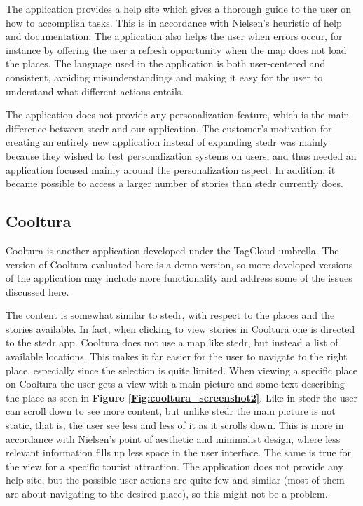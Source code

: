 The application provides a help site which gives a thorough guide to the user on how to accomplish tasks. This is in accordance with Nielsen's heuristic of help and documentation. The application also helps the user when errors occur, for instance by offering the user a refresh opportunity when the map does not load the places. The language used in the application is both user-centered and consistent, avoiding misunderstandings and making it easy for the user to understand what different actions entails. \newline

The application does not provide any personalization feature, which is the main difference between stedr and our application. The customer’s motivation for creating an entirely new application instead of expanding stedr was mainly because they wished to test personalization systems on users, and thus needed an application focused mainly around the personalization aspect. In addition, it became possible to access a larger number of stories than stedr currently does. 

\subsection{Cooltura}

Cooltura is another application developed under the TagCloud umbrella. The version of Cooltura evaluated here is a demo version, so more developed versions of the application may include more functionality and address some of the issues discussed here. \newline

The content is somewhat similar to stedr, with respect to the places and the stories available. In fact, when clicking to view stories in Cooltura one is directed to the stedr app. Cooltura does not use a map like stedr, but instead a list of available locations. This makes it far easier for the user to navigate to the right place, especially since the selection is quite limited. When viewing a specific place on Cooltura the user gets a view with a main picture and some text describing the place as seen in \textbf{Figure \ref{Fig:cooltura_screenshot2}}. Like in stedr the user can scroll down to see more content, but unlike stedr the main picture is not static, that is, the user see less and less of it as it scrolls down. This is more in accordance with Nielsen's point of aesthetic and minimalist design, where less relevant information fills up less space in the user interface. The same is true for the view for a specific tourist attraction. The application does not provide any help site, but the possible user actions are quite few and similar (most of them are about navigating to the desired place), so this might not be a problem.\newline

